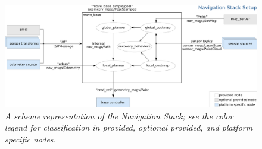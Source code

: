 \begin{figure}
	\centering
	\includegraphics[width=1.1\textwidth]{Images/background_and_tools/navigationStack.png}
	\caption{\textit{A scheme representation of the Navigation Stack; see the color legend for classification in provided, optional provided, and platform specific nodes.}}
	\label{fig:navStack}
\end{figure}











